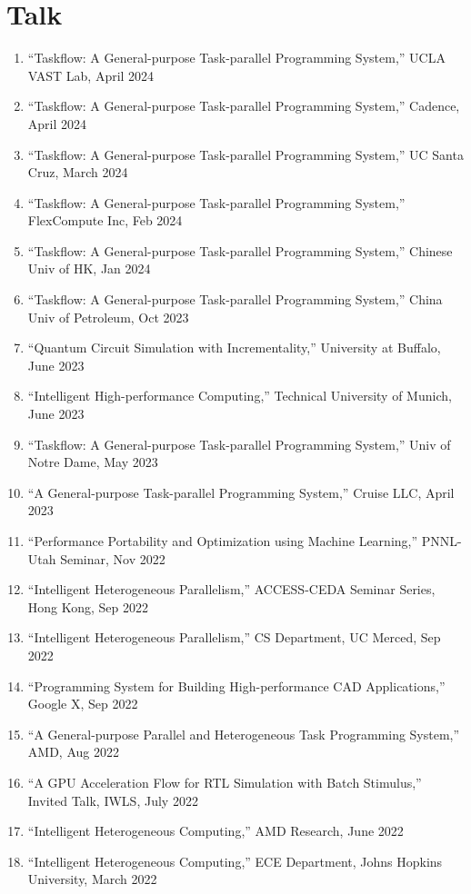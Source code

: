 \documentclass[A4,11pt]{article}
\begin{document}
\section{Talk}
 \begin{enumerate}
 \itemsep-0.3em
  \item ``Taskflow: A General-purpose Task-parallel Programming System,'' UCLA VAST Lab, April 2024
  \item ``Taskflow: A General-purpose Task-parallel Programming System,'' Cadence, April 2024
  \item ``Taskflow: A General-purpose Task-parallel Programming System,'' UC Santa Cruz, March 2024 
  \item ``Taskflow: A General-purpose Task-parallel Programming System,'' FlexCompute Inc, Feb 2024
  \item ``Taskflow: A General-purpose Task-parallel Programming System,'' Chinese Univ of HK, Jan 2024
  \item ``Taskflow: A General-purpose Task-parallel Programming System,'' China Univ of Petroleum, Oct 2023
  \item ``Quantum Circuit Simulation with Incrementality,'' University at Buffalo, June 2023
  \item ``Intelligent High-performance Computing,'' Technical University of Munich, June 2023
  \item ``Taskflow: A General-purpose Task-parallel Programming System,'' Univ of Notre Dame, May 2023
  \item ``A General-purpose Task-parallel Programming System,'' Cruise LLC, April 2023
  \item ``Performance Portability and Optimization using Machine Learning,'' PNNL-Utah Seminar, Nov 2022
  \item ``Intelligent Heterogeneous Parallelism,'' ACCESS-CEDA Seminar Series, Hong Kong, Sep 2022
  \item ``Intelligent Heterogeneous Parallelism,'' CS Department, UC Merced, Sep 2022
  \item ``Programming System for Building High-performance CAD Applications,'' Google X, Sep 2022
  \item ``A General-purpose Parallel and Heterogeneous Task Programming System,'' AMD, Aug 2022
  \item ``A GPU Acceleration Flow for RTL Simulation with Batch Stimulus,'' Invited Talk, IWLS, July 2022
  \item ``Intelligent Heterogeneous Computing,'' AMD Research, June 2022
  \item ``Intelligent Heterogeneous Computing,'' ECE Department, Johns Hopkins University, March 2022

\end{enumerate}
\end{document}
